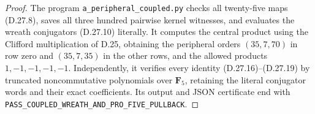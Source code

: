 \begin{proof}
The program \texttt{a\_peripheral\_coupled.py} checks all
twenty-five maps \textup{(D.27.8)}, saves all three hundred
pairwise kernel witnesses, and evaluates the wreath
conjugators \textup{(D.27.10)} literally.  It computes the
central product using the Clifford multiplication of D.25,
obtaining the peripheral orders $(35,7,70)$ in row zero
and $(35,7,35)$ in the other rows, and the allowed products
$1,-1,-1,-1,-1$.  Independently, it verifies every identity
\textup{(D.27.16)--(D.27.19)} by truncated noncommutative
polynomials over $\mathbf F_5$, retaining the literal
conjugator words and their exact coefficients.  Its output
and JSON certificate end with
\texttt{PASS\_COUPLED\_WREATH\_AND\_PRO\_FIVE\_PULLBACK}.
\end{proof}
